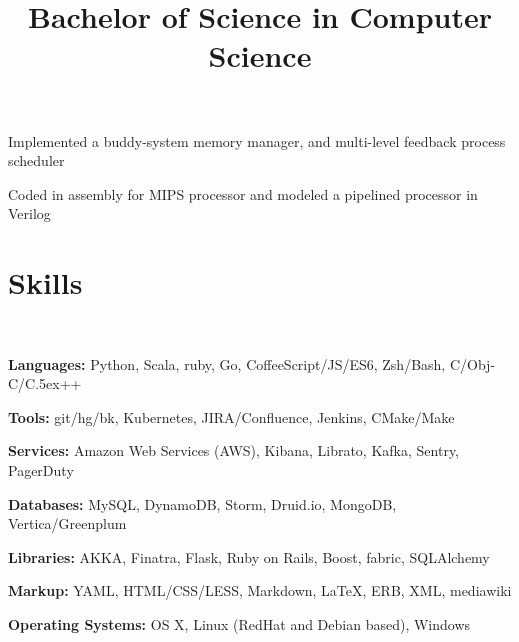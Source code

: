\documentclass[12pt, tweaklist, line]{res}
\let\tempone\itemize
\let\temptwo\enditemize
\renewenvironment{itemize}{\tempone\vspace{-.15in}\setlength{\topsep}{0pt}\setlength{\itemsep}{3pt}\vspace{-.15in}}{\temptwo}
\def\Cplusplus{{\rm C\raise.5ex\hbox{\small ++}}}
\begin{document}
\begin{resume}
\title{Bachelor of Science in Computer Science}
\begin{position}
\begin{itemize}
\item Implemented a buddy-system memory manager, and multi-level feedback process scheduler
\item Coded in assembly for MIPS processor and modeled a pipelined processor in Verilog
\end{itemize}
\end{position}

\section{Skills}

~\\ %

\begin{itemize}
\item \textbf{Languages:} Python, Scala, ruby, Go, CoffeeScript/JS/ES6, Zsh/Bash, C/Obj-C/\Cplusplus
\item \textbf{Tools:} git/hg/bk, Kubernetes, JIRA/Confluence, Jenkins, CMake/Make
\item \textbf{Services:} Amazon Web Services (AWS), Kibana, Librato, Kafka, Sentry, PagerDuty
\item \textbf{Databases:} MySQL, DynamoDB, Storm, Druid.io, MongoDB, Vertica/Greenplum
\item \textbf{Libraries:} AKKA, Finatra, Flask, Ruby on Rails, Boost, fabric, SQLAlchemy
\item \textbf{Markup:} YAML, HTML/CSS/LESS, Markdown, \LaTeX, ERB, XML, mediawiki
\item \textbf{Operating Systems:} OS X, Linux (RedHat and Debian based), Windows
\end{itemize}

\end{resume}
\end{document}
